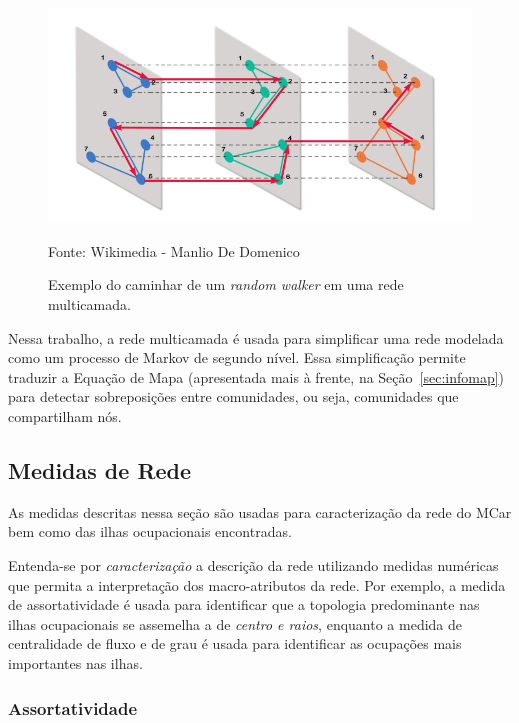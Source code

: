 \documentclass[12pt,a4paper]{article}
\newcommand{\source}[1]{\vspace{-10pt} \caption*{Fonte: {#1}} }
\begin{document}
\begin{figure}[ht]
    \centering
    \includegraphics[scale=0.4]{random_walks_on_multilayer_networks}
    \caption{Exemplo do caminhar de um \textit{random walker} em uma rede multicamada.}
    \source{Wikimedia - Manlio De Domenico}
    \label{fig:ex-multicamada}
\end{figure}

Nessa trabalho, a rede multicamada é usada para simplificar uma rede modelada como um processo de Markov de segundo nível. Essa simplificação permite traduzir a Equação de Mapa (apresentada mais à frente, na Seção~\ref{sec:infomap}) para detectar sobreposições entre comunidades, ou seja, comunidades que compartilham nós.

\subsection{Medidas de Rede} \label{sec:medidas-de-rede}

As medidas descritas nessa seção são usadas para caracterização da rede do MCar bem como das ilhas ocupacionais encontradas.

Entenda-se por \textit{caracterização} a descrição da rede utilizando medidas numéricas que permita a interpretação dos macro-atributos da rede. Por exemplo, a medida de assortatividade é usada para identificar que a topologia predominante nas ilhas ocupacionais se assemelha a de \textit{centro e raios}, enquanto a medida de centralidade de fluxo e de grau é usada para identificar as ocupações mais importantes nas ilhas.

\subsubsection{Assortatividade} \label{sec:assortatividade}
\end{document}
